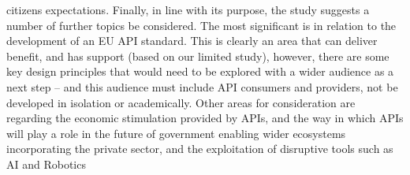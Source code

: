 citizens expectations.
Finally, in line with its purpose, the study suggests a number of further topics be considered. The most
significant is in relation to the development of an EU API standard. This is clearly an area that can deliver
benefit, and has support (based on our limited study), however, there are some key design principles that
would need to be explored with a wider audience as a next step – and this audience must include API
consumers and providers, not be developed in isolation or academically. Other areas for consideration are
regarding the economic stimulation provided by APIs, and the way in which APIs will play a role in the future
of government enabling wider ecosystems incorporating the private sector, and the exploitation of disruptive
tools such as AI and Robotics


